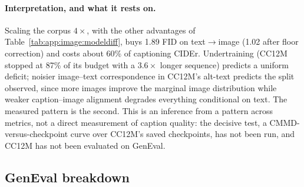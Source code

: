 \paragraph{Interpretation, and what it rests on.} Scaling the corpus $4\times$, with the other
advantages of Table~\ref{tab:app:image:modeldiff}, buys 1.89 FID on text$\rightarrow$image (1.02
after floor correction) and costs about 60\% of captioning CIDEr. Undertraining (CC12M stopped at
87\% of its budget with a $3.6\times$ longer sequence) predicts a uniform deficit; noisier
image--text correspondence in CC12M's alt-text predicts the split observed, since more images
improve the marginal image distribution while weaker caption--image alignment degrades everything
conditional on text. The measured pattern is the second. This is an inference from a pattern
across metrics, not a direct measurement of caption quality: the decisive test, a
CMMD-versus-checkpoint curve over CC12M's saved checkpoints, has not been run, and CC12M has not
been evaluated on GenEval.

\subsection{GenEval breakdown}
\label{app:image:geneval}

